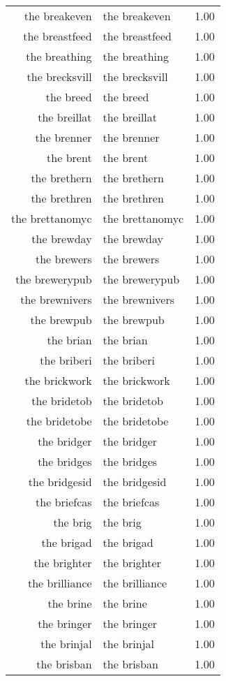 \begin{table}[ht]
\begin{tabular}{rlr}
  the breakeven & the breakeven & 1.00 \\ 
  the breastfeed & the breastfeed & 1.00 \\ 
  the breathing & the breathing & 1.00 \\ 
  the brecksvill & the brecksvill & 1.00 \\ 
  the breed & the breed & 1.00 \\ 
  the breillat & the breillat & 1.00 \\ 
  the brenner & the brenner & 1.00 \\ 
  the brent & the brent & 1.00 \\ 
  the brethern & the brethern & 1.00 \\ 
  the brethren & the brethren & 1.00 \\ 
  the brettanomyc & the brettanomyc & 1.00 \\ 
  the brewday & the brewday & 1.00 \\ 
  the brewers & the brewers & 1.00 \\ 
  the brewerypub & the brewerypub & 1.00 \\ 
  the brewnivers & the brewnivers & 1.00 \\ 
  the brewpub & the brewpub & 1.00 \\ 
  the brian & the brian & 1.00 \\ 
  the briberi & the briberi & 1.00 \\ 
  the brickwork & the brickwork & 1.00 \\ 
  the bridetob & the bridetob & 1.00 \\ 
  the bridetobe & the bridetobe & 1.00 \\ 
  the bridger & the bridger & 1.00 \\ 
  the bridges & the bridges & 1.00 \\ 
  the bridgesid & the bridgesid & 1.00 \\ 
  the briefcas & the briefcas & 1.00 \\ 
  the brig & the brig & 1.00 \\ 
  the brigad & the brigad & 1.00 \\ 
  the brighter & the brighter & 1.00 \\ 
  the brilliance & the brilliance & 1.00 \\ 
  the brine & the brine & 1.00 \\ 
  the bringer & the bringer & 1.00 \\ 
  the brinjal & the brinjal & 1.00 \\ 
  the brisban & the brisban & 1.00 \\ 

\end{tabular}
\end{table}
